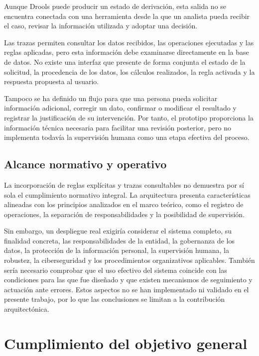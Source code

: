 \documentclass[12pt,a4paper]{report}
\begin{document}
Aunque Drools puede producir un estado de derivación, esta salida no se encuentra conectada con una herramienta desde la que un analista pueda recibir el caso, revisar la información utilizada y adoptar una decisión.

Las trazas permiten consultar los datos recibidos, las operaciones ejecutadas y las reglas aplicadas, pero esta información debe examinarse directamente en la base de datos. No existe una interfaz que presente de forma conjunta el estado de la solicitud, la procedencia de los datos, los cálculos realizados, la regla activada y la respuesta propuesta al usuario.

Tampoco se ha definido un flujo para que una persona pueda solicitar información adicional, corregir un dato, confirmar o modificar el resultado y registrar la justificación de su intervención. Por tanto, el prototipo proporciona la información técnica necesaria para facilitar una revisión posterior, pero no implementa todavía la supervisión humana como una etapa efectiva del proceso.

\subsection{Alcance normativo y operativo}

La incorporación de reglas explícitas y trazas consultables no demuestra por sí sola el cumplimiento normativo integral. La arquitectura presenta características alineadas con los principios analizados en el marco teórico, como el registro de operaciones, la separación de responsabilidades y la posibilidad de supervisión. 

Sin embargo, un despliegue real exigiría considerar el sistema completo, su finalidad concreta, las responsabilidades de la entidad, la gobernanza de los datos, la protección de la información personal, la supervisión humana, la robustez, la ciberseguridad y los procedimientos organizativos aplicables. También sería necesario comprobar que el uso efectivo del sistema coincide con las condiciones para las que fue diseñado y que existen mecanismos de seguimiento y actuación ante errores. Estos aspectos no se han implementado ni validado en el presente trabajo, por lo que las conclusiones se limitan a la contribución arquitectónica.

\section{Cumplimiento del objetivo general}
\end{document}
